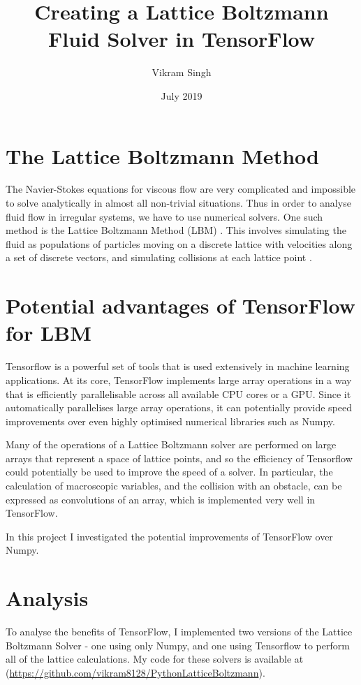 \documentclass{article}
\title{\Huge Creating a Lattice Boltzmann Fluid Solver in TensorFlow}
\author{Vikram Singh}
\date{July 2019}
\begin{document}
\maketitle

\section{The Lattice Boltzmann Method}

The Navier-Stokes equations for viscous flow are very complicated and impossible to solve analytically in almost all non-trivial situations. Thus in order to analyse fluid flow in irregular systems, we have to use numerical solvers. One such method is the Lattice Boltzmann Method (LBM) \cite{LBPaper}. This involves simulating the fluid as populations of particles moving on a discrete lattice with velocities along a set of discrete vectors, and simulating collisions at each lattice point \cite{LBBook}.

\section{Potential advantages of TensorFlow for LBM}


Tensorflow is a powerful set of tools that is used extensively in machine learning applications. 
At its core, TensorFlow implements large array operations in a way that  is efficiently parallelisable across all available CPU cores or a GPU.
Since it automatically parallelises large array operations, it can potentially provide speed improvements over even highly optimised numerical libraries such as Numpy.

Many of the operations of a Lattice Boltzmann solver are performed on large arrays that represent a space of lattice points, and so the efficiency of Tensorflow could potentially be used to improve the speed of a solver.
In particular, the calculation of macroscopic variables, and the collision with an obstacle, can be expressed as convolutions of an array, which is implemented very well in TensorFlow.

In this project I investigated the potential improvements of TensorFlow over Numpy.

\section{Analysis}

To analyse the benefits of TensorFlow, I implemented two versions of the Lattice Boltzmann Solver - one using only Numpy, and one using Tensorflow to perform all of the lattice calculations. My code for these solvers is available at (\url{https://github.com/vikram8128/PythonLatticeBoltzmann}).
\end{document}
